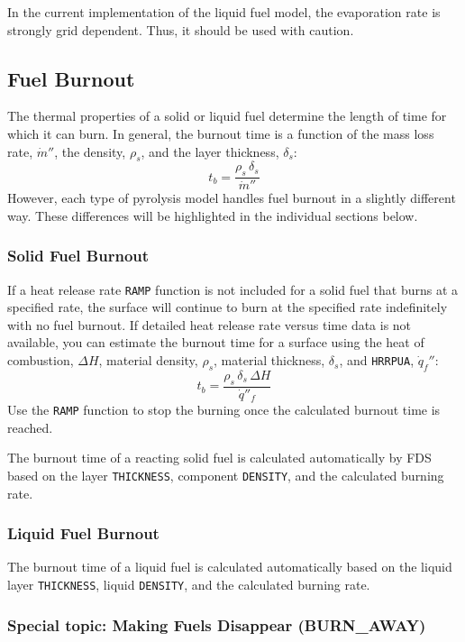 \documentclass[11pt]{book}
\newcommand{\ct}{\tt\small}
\newcommand{\dq}{\dot{q}}
\newcommand{\dm}{\dot{m}}
\newcommand{\be}{\begin{equation}}
\newcommand{\ee}{\end{equation}}
\begin{document}
\begin{warning}
\noindent
In the current implementation of the liquid fuel model, the
evaporation rate is strongly grid dependent. Thus, it should be used
with caution.
\end{warning}




\subsection{Fuel Burnout}

The thermal properties of a solid or liquid fuel determine the length of time for which it can burn. In general, the
burnout time is a function of the mass loss rate, $\dot{m}''$, the density, $\rho_s$, and the
layer thickness, $\delta_s$:
\be t_b = \frac{\rho_s \, \delta_s}{\dm''} \ee
However, each type of pyrolysis model handles fuel burnout in a slightly different way. These differences will be
highlighted in the individual sections below.

\subsubsection{Solid Fuel Burnout}

If a heat release rate {\ct RAMP} function is not included for a solid fuel that burns at a specified rate, the surface will continue to
burn at the specified rate indefinitely with no fuel burnout.  If detailed heat release rate versus time data is not available, you
can estimate the burnout time for a surface using the heat of combustion, $\Delta H$,
material density, $\rho_s$, material thickness, $\delta_s$, and {\ct HRRPUA}, $\dq_f''$:
\be t_{b} = \frac{\rho_s \, \delta_s \, \Delta H}{\dq''_f} \ee
Use the {\ct RAMP} function to stop the burning once the calculated burnout time is reached.


The burnout time of a reacting solid fuel is calculated automatically by FDS based on the
layer {\ct THICKNESS}, component {\ct DENSITY}, and the calculated burning rate.


\subsubsection{Liquid Fuel Burnout}

The burnout time of a liquid fuel is calculated automatically based on the liquid layer {\ct THICKNESS}, liquid {\ct DENSITY}, and the calculated burning rate.


\subsubsection{Special topic: Making Fuels Disappear (BURN\_AWAY)}
\label{info:BURN_AWAY}
\end{document}
